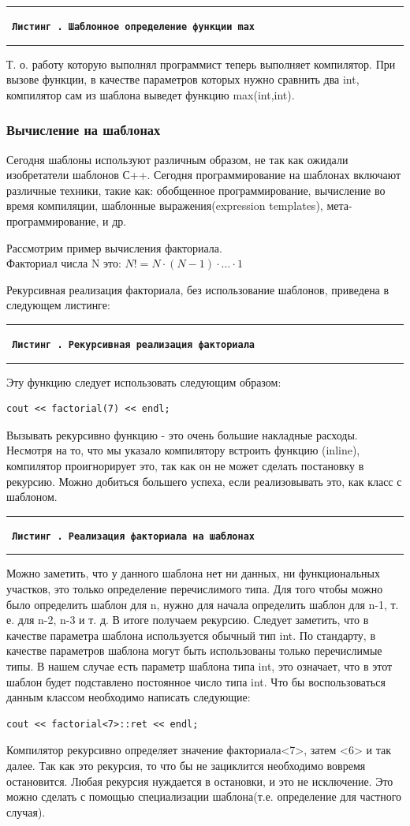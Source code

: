 \documentclass[12pt, a4paper]{article}
\newcommand{\HRule}{\noindent\rule{\linewidth}{0.45mm}}
\newcounter{sourcecode}
\newcommand*{\cppsource}[2]{\par{\HRule \small \tt \bf \noindent \ Листинг \arabic{sourcecode}. {\rm \small #2} \vspace{0.25cm}}%
\addtocounter{sourcecode}{1}  \HRule}
\begin{document}
\cppsource{src/definetemplate.tex}{Шаблонное определение функции {\bf max}}

Т. о. работу которую выполнял программист теперь выполняет компилятор. При вызове функции, в качестве параметров которых нужно сравнить два int, компилятор сам из шаблона выведет функцию max(int,int).
\subsubsection{Вычисление на шаблонах}
Сегодня шаблоны используют различным образом, не так как ожидали изобретатели
шаблонов С++. Сегодня программирование на шаблонах включают различные техники, такие как: обобщенное программирование, вычисление во время компиляции, шаблонные выражения(expression templates), мета-программирование, и др.

\noindent Рассмотрим пример вычисления факториала. \\
\noindent Факториал числа N это: $N! = N \cdot (N-1) \cdot \dots \cdot 1$

Рекурсивная реализация факториала, без использование шаблонов, приведена в следующем листинге:

\cppsource{src/rekfactorial.tex}{Рекурсивная реализация факториала}

Эту функцию следует использовать следующим образом:
\begin{verbatim}
cout << factorial(7) << endl;
\end{verbatim}
Вызывать рекурсивно функцию - это очень большие накладные расходы. Несмотря на то, что мы указало компилятору встроить функцию (inline), компилятор проигнорирует это, так как он не может сделать постановку в рекурсию. Можно добиться большего успеха, если реализовывать это, как класс с шаблоном.

\cppsource{src/templatefactorial.tex}{Реализация факториала на шаблонах}

Можно заметить, что у данного шаблона нет ни данных, ни функциональных участков, это только определение перечислимого типа. Для того чтобы можно было определить шаблон для n, нужно для начала определить шаблон для n-1, т. е. для n-2, n-3 и т. д. В итоге получаем рекурсию. Следует заметить, что в качестве параметра шаблона используется обычный тип int. По стандарту, в качестве параметров шаблона могут быть использованы только перечислимые типы. В нашем случае есть параметр шаблона типа int, это означает, что в этот шаблон будет подставлено постоянное число типа int. Что бы воспользоваться данным классом необходимо написать следующие:
\begin{verbatim}
cout << factorial<7>::ret << endl;
\end{verbatim}
Компилятор рекурсивно определяет значение факториала<7>, затем <6> и так далее. Так как это рекурсия, то что бы не зациклится необходимо вовремя остановится. Любая рекурсия нуждается в остановки, и это не исключение. Это можно сделать с помощью специализации шаблона(т.е. определение для частного случая).
\end{document}
